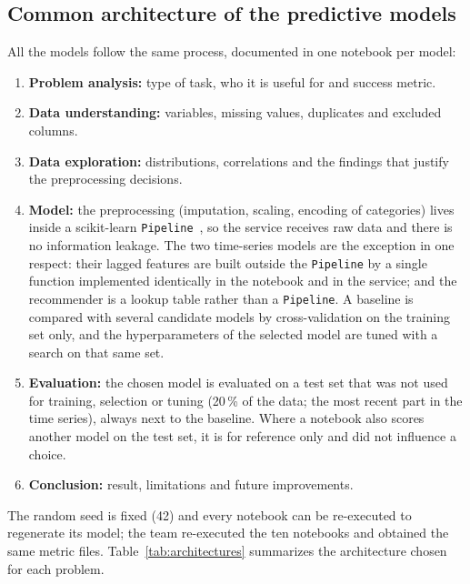 \documentclass[11pt,letterpaper]{article}
\newcommand{\code}[1]{\texttt{#1}}
\begin{document}
\subsection{Common architecture of the predictive models}

All the models follow the same process, documented in one notebook per model:

\begin{enumerate}
\item \textbf{Problem analysis:} type of task, who it is useful for and success metric.
\item \textbf{Data understanding:} variables, missing values, duplicates and excluded columns.
\item \textbf{Data exploration:} distributions, correlations and the findings that justify the preprocessing decisions.
\item \textbf{Model:} the preprocessing (imputation, scaling, encoding of categories) lives inside a scikit-learn \code{Pipeline}~\cite{pedregosa2011}, so the service receives raw data and there is no information leakage. The two time-series models are the exception in one respect: their lagged features are built outside the \code{Pipeline} by a single function implemented identically in the notebook and in the service; and the recommender is a lookup table rather than a \code{Pipeline}. A baseline is compared with several candidate models by cross-validation on the training set only, and the hyperparameters of the selected model are tuned with a search on that same set.
\item \textbf{Evaluation:} the chosen model is evaluated on a test set that was not used for training, selection or tuning (20\,\% of the data; the most recent part in the time series), always next to the baseline. Where a notebook also scores another model on the test set, it is for reference only and did not influence a choice.
\item \textbf{Conclusion:} result, limitations and future improvements.
\end{enumerate}

The random seed is fixed (42) and every notebook can be re-executed to regenerate its model; the team re-executed the ten notebooks and obtained the same metric files. Table~\ref{tab:architectures} summarizes the architecture chosen for each problem.
\end{document}
